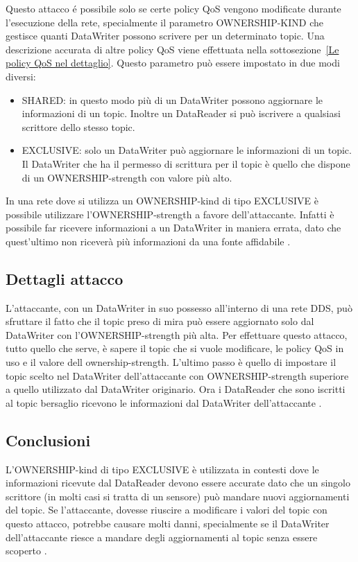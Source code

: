 Questo attacco é possibile solo se certe policy QoS vengono
modificate durante l'esecuzione della rete, specialmente il parametro
OWNERSHIP-KIND che gestisce quanti DataWriter possono scrivere per un
determinato topic. Una descrizione accurata di altre policy QoS viene 
effettuata nella sottosezione~\ref{Le policy QoS nel dettaglio}.
Questo parametro può essere impostato in due modi diversi:
\begin{itemize}
    \item SHARED: in questo modo più di un DataWriter possono aggiornare le
    informazioni di un topic. Inoltre un DataReader si può iscrivere a
    qualsiasi scrittore dello stesso topic.
    \item EXCLUSIVE: solo un DataWriter può aggiornare le informazioni di un
    topic. Il DataWriter che ha il permesso di scrittura per il topic è quello
    che dispone di un OWNERSHIP-strength con valore più alto.
\end{itemize}
In una rete dove si utilizza un OWNERSHIP-kind di tipo EXCLUSIVE è possibile
utilizzare l'OWNERSHIP-strength a favore
dell'attaccante. Infatti è possibile far ricevere informazioni a un DataWriter
in maniera errata, dato che quest'ultimo non riceverà più informazioni da
una fonte affidabile 
\cite{DBLP:conf/malware/MichaudDL18}.


\subsection{Dettagli attacco}
L'attaccante, con un DataWriter in suo possesso all'interno di una rete DDS,
può sfruttare il fatto che il topic preso di mira può essere aggiornato
solo dal DataWriter con l'OWNERSHIP-strength più alta.
Per effettuare questo attacco, tutto quello che serve, è sapere il topic che
si vuole modificare, le policy QoS in uso e il valore dell ownership-strength.
L'ultimo passo è quello di impostare il topic scelto nel DataWriter
dell'attaccante con OWNERSHIP-strength superiore a quello utilizzato dal
DataWriter originario.
Ora i DataReader che sono iscritti al topic bersaglio
ricevono le informazioni dal DataWriter dell'attaccante
\cite{DBLP:conf/malware/MichaudDL18}.


\subsection{Conclusioni}
L'OWNERSHIP-kind di tipo EXCLUSIVE è utilizzata in contesti dove le
informazioni ricevute dal DataReader devono essere accurate dato che un singolo
scrittore (in molti casi si tratta di un sensore) può mandare nuovi aggiornamenti
del topic. Se l'attaccante, dovesse riuscire a modificare i valori del topic con
questo attacco, potrebbe causare molti danni,
specialmente se il DataWriter dell'attaccante riesce a mandare degli aggiornamenti
al topic senza essere scoperto
\cite{DBLP:conf/malware/MichaudDL18}.

